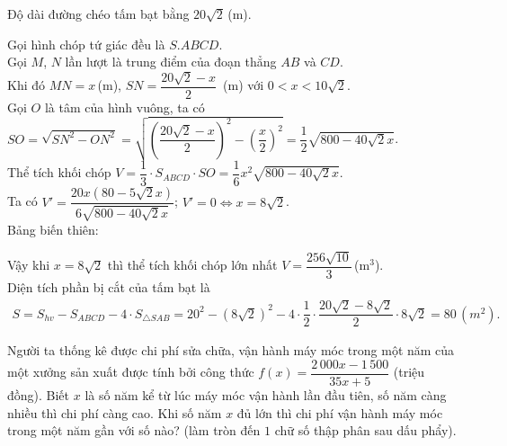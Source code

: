 \begin{bt}
{Độ dài đường chéo tấm bạt bằng $20 \sqrt{2}$\,(m).

Gọi hình chóp tứ giác đều là $S.ABCD$.\\
Gọi $M$, $N$ lần lượt là trung điểm của đoạn thẳng $AB$ và $CD$.\\
Khi đó $MN=x$\,(m), $SN=\dfrac{20 \sqrt{2}-x}{2}$\, (m) với $0<x<10 \sqrt{2}$.\\
Gọi $O$ là tâm của hình vuông, ta có\\
$SO=\sqrt{SN^2-ON^2}=\sqrt{\left(\dfrac{20 \sqrt{2}-x}{2}\right)^2-\left(\dfrac{x}{2}\right)^2}=\dfrac{1}{2} \sqrt{800-40 \sqrt{2}x}$.\\
Thể tích khối chóp $V=\dfrac{1}{3}\cdot S_{ABCD} \cdot SO=\dfrac{1}{6} x^2 \sqrt{800-40 \sqrt{2} x}$.\\
Ta có $V'=\dfrac{20 x(80-5 \sqrt{2} x)}{6 \sqrt{800-40 \sqrt{2} x}}$; $V'=0 \Leftrightarrow x=8 \sqrt{2}$.\\
Bảng biến thiên:
\begin{center}
\end{center}
Vậy khi $x=8 \sqrt{2}$ thì thể tích khối chóp lớn nhất $V=\dfrac{256 \sqrt{10}}{3}$\,(m$^3$).\\
Diện tích phần bị cắt của tấm bạt là
\begin{eqnarray*}
S=S_{hv}-S_{ABCD}-4 \cdot S_{\triangle {SAB}}=20^2-(8 \sqrt{2})^2-4 \cdot \dfrac{1}{2} \cdot \dfrac{20 \sqrt{2}-8 \sqrt{2}}{2} \cdot 8 \sqrt{2}=80\,(m^2).
\end{eqnarray*}
}
\end{bt}

\begin{bt}%
	Người ta thống kê được chi phí sửa chữa, vận hành máy móc trong một năm của một xưởng sản xuất được tính bởi công thức $f\left( x \right)=\dfrac{2\,000x-1\,500}{35x+5}$ (triệu đồng). Biết $x$ là số năm kể từ lúc máy móc vận hành lần đầu tiên, số năm càng nhiều thì chi phí càng cao. Khi số năm $x$ đủ lớn thì chi phí vận hành máy móc trong một năm gần với số nào? (làm tròn đến $1$ chữ số thập phân sau dấu phẩy).\\
\end{bt}

